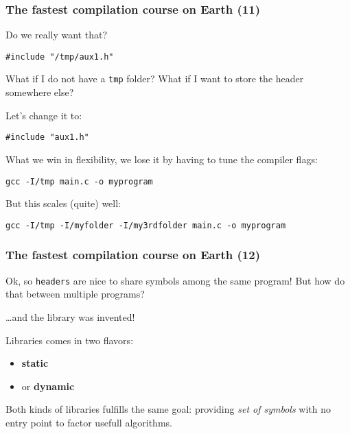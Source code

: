 \documentclass[hyperref={pdfpagelabels=false}]{beamer}
\begin{document}
\begin{frame}[fragile]
\frametitle{The fastest compilation course on Earth (11)}

Do we really want that?

\begin{verbatim}
#include "/tmp/aux1.h"
\end{verbatim}

What if I do not have a \texttt{tmp} folder? What if I want to store
the header somewhere else?

\vspace{0.3cm}

Let's change it to:

\begin{verbatim}
#include "aux1.h"
\end{verbatim}

\vspace{0.3cm}

What we win in flexibility, we lose it by having to tune the compiler
flags:

\begin{verbatim}
gcc -I/tmp main.c -o myprogram
\end{verbatim}

\vspace{0.3cm}

But this scales (quite) well:

\begin{verbatim}
gcc -I/tmp -I/myfolder -I/my3rdfolder main.c -o myprogram
\end{verbatim}

\end{frame}

\begin{frame}[fragile]
\frametitle{The fastest compilation course on Earth (12)}

Ok, so \texttt{headers} are nice to share symbols among the same
program! But how do that between multiple programs?

\vspace{0.3cm}

\ldots and the library was invented!

\vspace{0.3cm}

Libraries comes in two flavors:

\begin{itemize}
\item \textbf{static}
\item or \textbf{dynamic}
\end{itemize}

Both kinds of libraries fulfills the same goal: providing \textit{set
  of symbols} with no entry point to factor usefull algorithms.

\end{frame}
\end{document}

